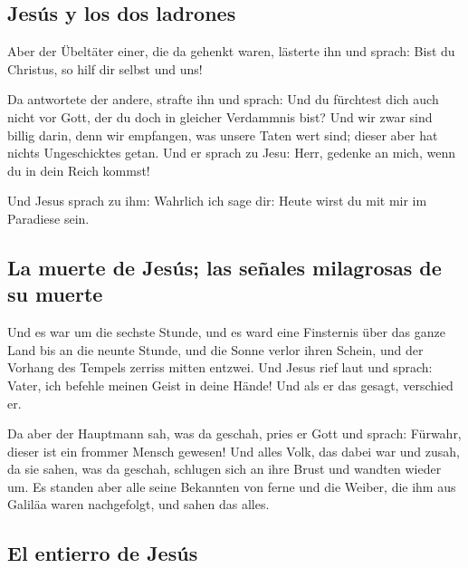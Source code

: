 \hypertarget{jesuxfas-y-los-dos-ladrones}{%
\subsection{Jesús y los dos
ladrones}\label{jesuxfas-y-los-dos-ladrones}}

 Aber der Übeltäter einer, die da gehenkt waren, lästerte
ihn und sprach: Bist du Christus, so hilf dir selbst und uns!

 Da antwortete der andere, strafte ihn und sprach: Und du
fürchtest dich auch nicht vor Gott, der du doch in gleicher Verdammnis
bist?  Und wir zwar sind billig darin, denn wir
empfangen, was unsere Taten wert sind; dieser aber hat nichts
Ungeschicktes getan.  Und er sprach zu Jesu: Herr,
gedenke an mich, wenn du in dein Reich kommst!

 Und Jesus sprach zu ihm: Wahrlich ich sage dir: Heute
wirst du mit mir im Paradiese sein.

\hypertarget{la-muerte-de-jesuxfas-las-seuxf1ales-milagrosas-de-su-muerte}{%
\subsection{La muerte de Jesús; las señales milagrosas de su
muerte}\label{la-muerte-de-jesuxfas-las-seuxf1ales-milagrosas-de-su-muerte}}

 Und es war um die sechste Stunde, und es ward eine
Finsternis über das ganze Land bis an die neunte Stunde, 
und die Sonne verlor ihren Schein, und der Vorhang des Tempels zerriss
mitten entzwei.  Und Jesus rief laut und sprach: Vater,
ich befehle meinen Geist in deine Hände! Und als er das gesagt,
verschied er.

 Da aber der Hauptmann sah, was da geschah, pries er Gott
und sprach: Fürwahr, dieser ist ein frommer Mensch gewesen!
 Und alles Volk, das dabei war und zusah, da sie sahen,
was da geschah, schlugen sich an ihre Brust und wandten wieder um.
 Es standen aber alle seine Bekannten von ferne und die
Weiber, die ihm aus Galiläa waren nachgefolgt, und sahen das alles.

\hypertarget{el-entierro-de-jesuxfas}{%
\subsection{El entierro de Jesús}\label{el-entierro-de-jesuxfas}}

